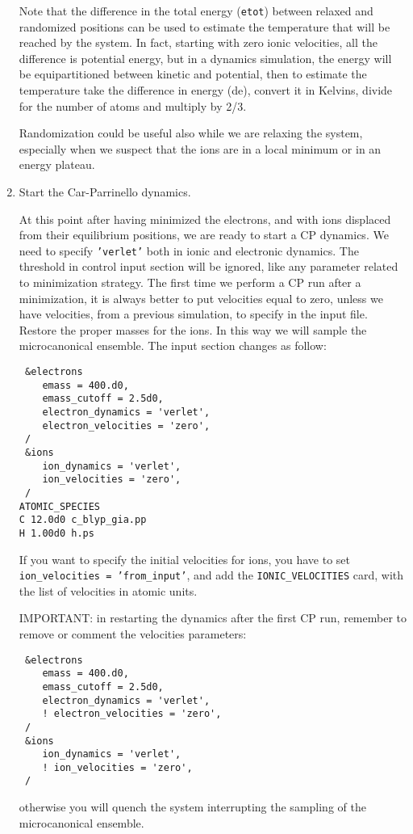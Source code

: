 \documentclass[12pt,a4paper]{article}
\begin{document}
\begin{enumerate}
    Note that the difference in the total energy (\texttt{etot})
    between relaxed and randomized positions can be used to estimate
    the temperature that will be reached by the system.
    In fact, starting with zero ionic velocities, all the difference
    is potential energy, but in a dynamics simulation, the energy will
    be equipartitioned between kinetic and potential, then to estimate
    the temperature take the difference in energy (de), convert it in
    Kelvins, divide for the number of atoms and multiply by 2/3.

    Randomization could be useful also while we are relaxing the
    system, especially when we suspect that the ions are in a local
    minimum or in an energy plateau.
   
  \item
    Start the Car-Parrinello dynamics.

    At this point after having minimized the electrons, and with ions
    displaced from their equilibrium positions, we are ready to start
    a CP dynamics.
    We need to specify \texttt{'verlet'} both in ionic and electronic
    dynamics.
    The threshold in control input section will be ignored, like any
    parameter related to minimization strategy.
    The first time we perform a CP run after a minimization, it is
    always better to put velocities equal to zero, unless we have
    velocities, from a previous simulation, to specify in the input
    file.
    Restore the proper masses for the ions.
    In this way we will sample the microcanonical ensemble.
    The input section changes as follow:
\begin{verbatim}
 &electrons
    emass = 400.d0,
    emass_cutoff = 2.5d0,
    electron_dynamics = 'verlet',
    electron_velocities = 'zero',
 /
 &ions
    ion_dynamics = 'verlet',
    ion_velocities = 'zero',
 /
ATOMIC_SPECIES
C 12.0d0 c_blyp_gia.pp
H 1.00d0 h.ps
\end{verbatim}
    If you want to specify the initial velocities for ions, you have
    to set \texttt{ion\_velocities = 'from\_input'}, and add the
    \texttt{IONIC\_VELOCITIES}\break
    card, with the list of velocities in atomic units.

    IMPORTANT: in restarting the dynamics after the first CP run,
    remember to remove or comment the velocities parameters:
\begin{verbatim}
 &electrons
    emass = 400.d0,
    emass_cutoff = 2.5d0,
    electron_dynamics = 'verlet',
    ! electron_velocities = 'zero',
 /
 &ions
    ion_dynamics = 'verlet',
    ! ion_velocities = 'zero',
 /
\end{verbatim}
    otherwise you will quench the system interrupting the sampling of
    the microcanonical ensemble.


\end{enumerate}
\end{document}
